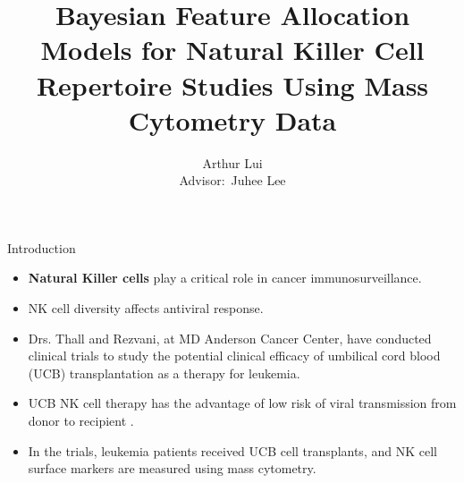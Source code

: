 \documentclass[ignorenonframetext,]{beamer}
\title[Bayesian FAM for CyTOF Data]{Bayesian Feature Allocation Models for Natural Killer Cell Repertoire Studies Using Mass Cytometry Data}
\author[A. Lui]{Arthur Lui \\ {\small Advisor$\colon$ Juhee Lee}}
\institute{Department of Statistics\\ UC Santa Cruz}
\begin{document}


\begin{frame}{Introduction}
  \begin{itemize}
    \setlength\itemsep{1em}
    \item
      \textbf{Natural Killer cells} play a critical role in cancer immunosurveillance.
    \item NK cell diversity affects antiviral response.
    \item Drs. Thall and Rezvani, at MD Anderson Cancer
      Center, have conducted clinical trials to study the potential clinical
      efficacy of umbilical cord blood (UCB) transplantation as a therapy for
      leukemia.
    \item UCB NK cell therapy has the advantage of low risk of viral
      transmission from donor to recipient \citep{sarvaria2017umbilical}.
    \item In the trials, leukemia patients received UCB cell transplants, and
      NK cell surface markers are measured using mass cytometry.
  \end{itemize}
\end{frame}
\end{document}
